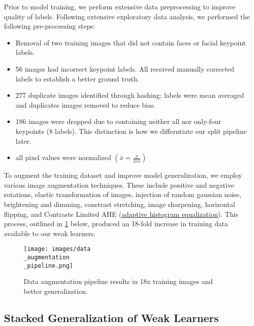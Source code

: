 Prior to model training, we perform extensive data preprocessing to improve quality of labels.  Following extensive exploratory data analysis, we performed the following pre-processing steps:
\begin{itemize}
	\vspace{-0.2em}\item Removal of two training images that did not contain faces or facial keypoint labels.
	\vspace{-0.8em}\item 56 images had incorrect keypoint labels.  All received manually corrected labels to establish a better ground truth.
	\vspace{-0.8em}\item 277 duplicate images identified through hashing; labels were mean averaged and duplicates images removed to reduce bias.
	\vspace{-0.8em}\item 186 images were dropped due to containing neither all nor only-four keypoints (8 labels). This distinction is how we differntiate our split pipeline later.
	\vspace{-0.8em}\item all pixel values were normalized $(\bar{x} = \frac{x}{255})$
\end{itemize}

\pagebreak

To augment the training dataset and improve model generalization, we employ various image augmentation techniques. These include positive and negative rotations, elastic transformation of images, injection of random gaussian noise, brightening and dimming, constrast stretching, image sharpening, horizontal flipping, and Contraste Limited AHE (\href{https://en.wikipedia.org/wiki/Adaptive_histogram_equalization}{adaptive histogram equalization}).  This process, outlined in \cref{fig:datapipeline} below, produced an 18-fold increase in training data available to our weak learners.

\begin{figure}[h]
	\centering
	\texttt{[image: images/data\\\_augmentation\\\_pipeline.png]}
	\caption{Data augmentation pipeline results in 18x training images and better generalization.}
	\label{fig:datapipeline}
\end{figure}

\subsection{Stacked Generalization of Weak Learners}

